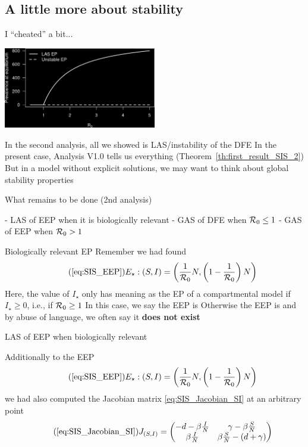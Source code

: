 \documentclass[aspectratio=43]{beamer}
\begin{document}
\subsection{A little more about stability}

\begin{frame}{I ``cheated'' a bit...}
  \begin{center}
    \includegraphics[width=0.5\textwidth]{../FIGS/endemic_SIS_EE_vs_R0_blackBG}
  \end{center}
\vfill
In the second analysis, all we showed is LAS/instability of the DFE
\vfill
In the present case, Analysis V1.0 tells us everything (Theorem~\ref{th:first_result_SIS_2})
\vfill
But in a model without explicit solutions, we may want to think about global stability properties
\end{frame}

\begin{frame}{What remains to be done (2nd analysis)}

- LAS of EEP when it is biologically relevant
\vfill
- GAS of DFE when $\mathcal{R}_0\leq 1$
\vfill
- GAS of EEP when $\mathcal{R}_0>1$
\end{frame}

\begin{frame}{Biologically relevant EP}
Remember we had found
\begin{equation}\tag{\ref{eq:SIS_EEP}}
  E_\star :(S,I)
=\left(
  \frac{1}{\R_0}N, 
  \left(1-\frac{1}{\R_0}\right)N
\right)
\end{equation}
\vfill
Here, the value of $I_\star$ only has meaning as the EP of a compartmental model if $I_\star\geq 0$, i.e., if $\mathcal{R}_0\geq 1$
\vfill
In this case, we say the EEP is 
\vfill
Otherwise the EEP is  and by abuse of language, we often say it \textbf{does not exist}
\end{frame}

\begin{frame}{LAS of EEP when biologically relevant}

Additionally to the EEP
\begin{equation}\tag{\ref{eq:SIS_EEP}}
E_\star :(S,I)
=\left(
  \frac{1}{\R_0}N, 
  \left(1-\frac{1}{\R_0}\right)N
\right)
\end{equation}
we had also computed the Jacobian matrix \eqref{eq:SIS_Jacobian_SI} at an arbitrary point 
\begin{equation}\tag{\ref{eq:SIS_Jacobian_SI}}
J_{(S,I)} =
\begin{pmatrix}
-d -\beta \frac IN & \gamma-\beta\frac SN \\
\beta \frac IN & \beta\frac SN-(d+\gamma)
\end{pmatrix}
\end{equation}
\end{frame}
\end{document}
